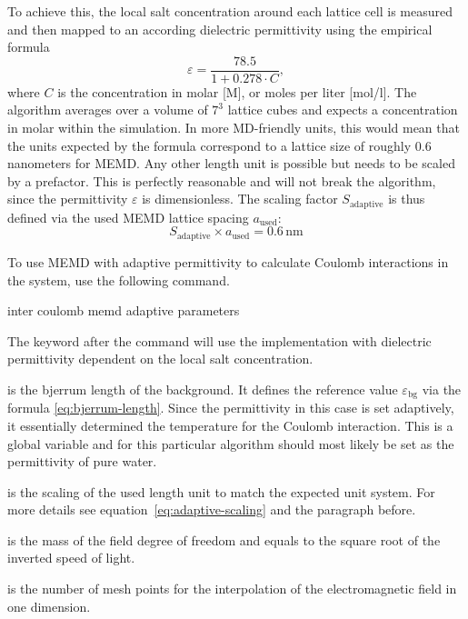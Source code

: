 To achieve this, the local salt concentration around each lattice cell is measured and then mapped to an according dielectric permittivity using the empirical formula
\begin{equation}
	\varepsilon = \frac{78.5}{1+0.278\cdot C},
	\label{eq:salt-map}
\end{equation}
where $C$ is the concentration in molar [M], or moles per liter [mol/l]. The algorithm averages over a volume of $7^3$ lattice cubes and expects a concentration in molar within the simulation. In more MD-friendly units, this would mean that the units expected by the formula correspond to a lattice size of roughly $0.6$ nanometers for MEMD. Any other length unit is possible but needs to be scaled by a prefactor. This is perfectly reasonable and will not break the algorithm, since the permittivity $\varepsilon$ is dimensionless. The scaling factor $S_\text{adaptive}$ is thus defined via the used MEMD lattice spacing $a_\text{used}$:
\begin{equation}
	S_\text{adaptive} \times a_\text{used} = 0.6\,\text{nm}
	\label{eq:adaptive-scaling}
\end{equation}

To use MEMD with adaptive permittivity to calculate Coulomb interactions in the system, use the following command.

\begin{essyntax}
  inter coulomb 
  memd adaptive 
  parameters  
  \begin{features}
  \end{features}
\end{essyntax}

The keyword  after the  command will use the implementation with dielectric permittivity dependent on the local salt concentration.

\begin{arguments}
\item[\var{l_B}] is the bjerrum length of the background. It defines
	the reference value $\varepsilon_\text{bg}$ via the formula 
	\eqref{eq:bjerrum-length}. Since the permittivity in this case is set
	adaptively, it essentially determined the temperature for the Coulomb
	interaction. This is a global variable and for this particular algorithm
	should most likely be set as the permittivity of pure water.
\item[\var{scaling}] is the scaling of the used length unit to match the expected unit system. For more details see equation~\ref{eq:adaptive-scaling} and the paragraph before.
\item[\var{f\_mass}] is the mass of the field degree of freedom and equals
  to the square root of the inverted speed of light.
\item[\var{mesh}] is the number of mesh points for the interpolation
  of the electromagnetic field in one dimension.
\end{arguments}

